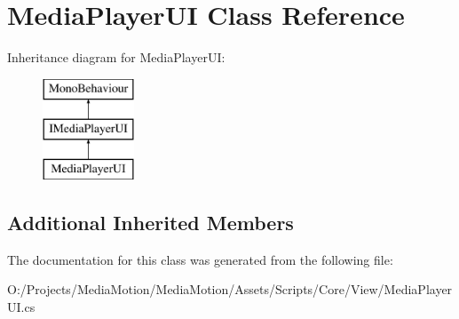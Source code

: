 \hypertarget{class_media_player_u_i}{\section{Media\+Player\+U\+I Class Reference}
\label{class_media_player_u_i}
}
Inheritance diagram for Media\+Player\+U\+I\+:\begin{figure}[H]
\begin{center}
\leavevmode
\includegraphics[height=3.000000cm]{class_media_player_u_i}
\end{center}
\end{figure}
\subsection*{Additional Inherited Members}


The documentation for this class was generated from the following file\+:\begin{DoxyCompactItemize}
\item 
O\+:/\+Projects/\+Media\+Motion/\+Media\+Motion/\+Assets/\+Scripts/\+Core/\+View/Media\+Player\+U\+I.\+cs\end{DoxyCompactItemize}
